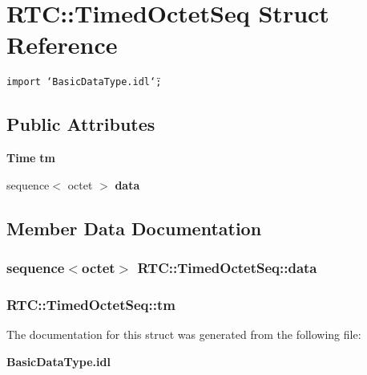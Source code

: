 \section{RTC::Timed\-Octet\-Seq Struct Reference}
\label{structRTC_1_1TimedOctetSeq}
{\tt import \char`\"{}Basic\-Data\-Type.idl\char`\"{};}

\subsection*{Public Attributes}
\begin{CompactItemize}
\item 
{\bf Time} {\bf tm}
\item 
sequence$<$ octet $>$ {\bf data}
\end{CompactItemize}


\subsection{Member Data Documentation}
\subsubsection{\setlength{\rightskip}{0pt plus 5cm}sequence$<$octet$>$ {\bf RTC::Timed\-Octet\-Seq::data}}\label{structRTC_1_1TimedOctetSeq_RTC_1_1TimedOctetSeqo1}


\subsubsection{ {\bf RTC::Timed\-Octet\-Seq::tm}}\label{structRTC_1_1TimedOctetSeq_RTC_1_1TimedOctetSeqo0}




The documentation for this struct was generated from the following file:\begin{CompactItemize}
\item 
{\bf Basic\-Data\-Type.idl}\end{CompactItemize}
